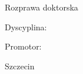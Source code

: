 \begin{titlepage}
  \centering
  \vspace*{2cm}

  {\large \ThesisAffiliation\par}
  \vspace{1.5cm}

  {\LARGE\bfseries \ThesisAuthor\par}
  \vspace{2cm}

  {\Huge\bfseries \ThesisTitle\par}
  \vspace{1.5cm}

  {\large Rozprawa doktorska\par}
  \vspace{0.5cm}
  {\large Dyscyplina: \ThesisDiscipline\par}

  \vfill

  {\large Promotor: \ThesisSupervisor\par}
  \vspace{1.5cm}
  {\large Szczecin \ThesisYear\par}

  \vspace{0.5cm}
  {\footnotesize \ThesisVersionLabel\par}
\end{titlepage}
